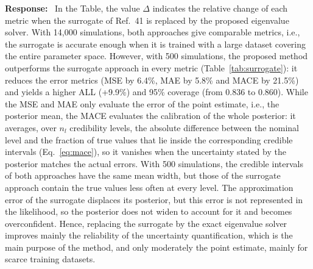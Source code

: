 \documentclass[11pt]{article}
\newenvironment{response}{\par\smallskip\noindent\color{resp}\textbf{Response:}\ }{\par}
\begin{document}
\begin{response}
In the Table, the value $\Delta$ indicates the relative change of each metric when the surrogate of Ref.~41 is replaced by the proposed eigenvalue solver.
With 14,000 simulations, both approaches give comparable metrics, i.e., the surrogate is accurate enough when it is trained with a large dataset covering the entire parameter space. However, with 500 simulations, the proposed method outperforms the surrogate approach in every metric (Table~\ref{tab:surrogate}): it reduces the error metrics (MSE by 6.4\%, MAE by 5.8\% and MACE by 21.5\%) and yields a higher ALL (+9.9\%) and  95\% coverage (from 0.836 to 0.860).
	While the MSE and MAE only evaluate the error of the point estimate, i.e., the posterior mean, the MACE evaluates the calibration of the whole posterior: it averages, over $n_{l}$ credibility levels, the absolute difference between the nominal level and the fraction of true values that lie inside the corresponding credible intervals (Eq.~\eqref{eq:mace}), so it vanishes when the uncertainty stated by the posterior matches the actual errors.
	With 500 simulations, the credible intervals of both approaches have the same mean width, but those of the surrogate approach contain the true values less often at every level. 
	The approximation error of the surrogate displaces its posterior, but this error is not represented in the likelihood, so the posterior does not widen to account for it and becomes overconfident. 
	Hence, replacing the surrogate by the exact eigenvalue solver improves mainly the reliability of the uncertainty quantification, which is the main purpose of the method, and only moderately the point estimate, mainly for scarce training datasets.






\end{response}
\end{document}
